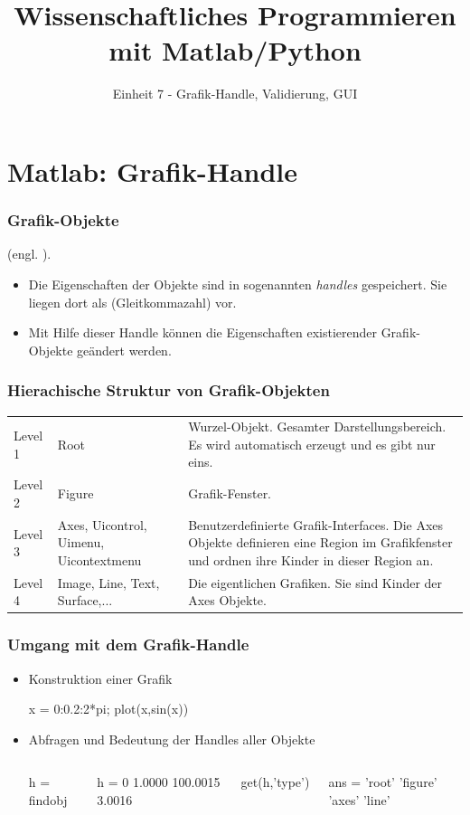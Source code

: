 \documentclass[hyperref={xetex}]{beamer}
\title{Wissenschaftliches Programmieren mit Matlab/Python}
\subtitle{Einheit 7 - Grafik-Handle, Validierung, GUI}
\begin{document}
\titlepage

%
%

\section{Matlab: Grafik-Handle}
\begin{frame}[fragile]\frametitle{Grafik-Objekte}
(engl. ). 
\begin{itemize}
\item Die Eigenschaften  der Objekte sind  in  sogenannten
{\it handles} gespeichert. Sie liegen dort als 
(Gleitkommazahl) vor.
\item Mit Hilfe dieser Handle können die Eigenschaften 
existierender Grafik-Objekte geändert werden.    
\end{itemize}
\end{frame}
%
%
\begin{frame}[fragile]\frametitle{Hierachische Struktur von Grafik-Objekten}
\begin{tabular}{lp{3cm}p{7cm}}
Level 1 & Root & Wurzel-Objekt. Gesamter Darstellungsbereich. Es wird automatisch erzeugt und es gibt nur eins.\\

Level 2 & Figure & Grafik-Fenster. \\

Level 3 & Axes, Uicontrol, Uimenu, Uicontextmenu & Benutzerdefinierte Grafik-Interfaces. 
Die Axes Objekte definieren eine Region im Grafikfenster und ordnen ihre Kinder in
dieser Region an.\\

Level 4 & Image, Line, Text, Surface,... & Die eigentlichen Grafiken. Sie sind Kinder der Axes Objekte.\\
\end{tabular}
\end{frame}
% 
%
\begin{frame}[fragile]\frametitle{Umgang mit dem Grafik-Handle}
\begin{itemize}
\item Konstruktion einer Grafik
\begin{matlabin}
x = 0:0.2:2*pi;
plot(x,sin(x))
\end{matlabin}
\item Abfragen und Bedeutung der Handles aller Objekte\\
\begin{columns}[t]
\begin{matlabin}
h = findobj
\end{matlabin}
\begin{matlab}
h =
         0
    1.0000
  100.0015
    3.0016
\end{matlab}
\begin{matlabin}
get(h,'type')
\end{matlabin}
\begin{matlab}
ans = 
    'root'
    'figure'
    'axes'
    'line'
\end{matlab} 
\end{columns}
\end{itemize}
\end{frame}
\end{document}
